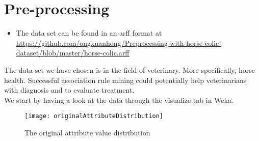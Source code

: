 \section{Pre-processing}

\begin{itemize}
\item The data set can be found in an arff format at \\ \href{github.com/ongxuanhong/Preprocessing-with-horse-colic-dataset/blob/master/horse-colic.arff}{https://github.com/ongxuanhong/Preprocessing-with-horse-colic-dataset/blob/master/horse-colic.arff}
\end{itemize}
The data set we have chosen is in the field of veterinary. More specifically, horse health. Successful association rule mining could potentially help veterinarians with diagnosis and  to evaluate treatment.\\
We start by having a look at the data through the visualize tab in Weka.
\begin{figure}[h!]
\centering
\texttt{[image: originalAttributeDistribution]}
\caption{The original attribute value distribution}
\end{figure}


